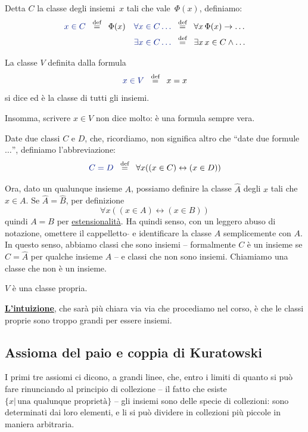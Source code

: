 \begin{notation}
Detta $C$ la classe degli insiemi~$x$ tali che vale~$\Phi(x)$, definiamo:
\begin{align*}
{\drkblu x \in C} &\;\;\Mydef\;\; \Phi(x) & {\drkblu \forall{x\in
C}\dotsc} &\;\;\Mydef\;\; \forall x \,
\Phi(x)\rightarrow\dotsc\\
&& {\drkblu \exists{x\in C}\dotsc} &\;\;\Mydef\;\; \exists x \,
x\in C \land \dotsc
\end{align*}
\end{notation}

\begin{definition}
La classe $V$ definita dalla formula
\[ {\drkblu x \in V} \;\;\Mydef\;\; x = x \]
si dice  ed \`e la classe di tutti gli insiemi.
\end{definition}

\begin{note}
Insomma, scrivere $x \in V$ non dice molto: \`e una formula sempre vera.
\end{note}

\begin{notation}
Date due classi $C$ e $D$, che, ricordiamo, non significa altro che ``date due formule$\ldots$'', definiamo l'abbreviazione:
\[ {\drkblu C = D} \;\;\Mydef\;\; \forall x ((x \in C) \leftrightarrow (x \in D))
\]
\end{notation}

Ora, dato un qualunque insieme $A$, possiamo definire la classe $\hat{A}$
degli $x$ tali che $x \in A$. Se $\hat{A} = \hat{B}$, per definizione
\[ \forall x ((x \in A) \leftrightarrow (x \in B))
	\]
quindi $A = B$ per \hyperref[ax2]{estensionalit\`a}. Ha quindi senso, con un leggero abuso di notazione, omettere il cappelletto $\hat{}$ e identificare la classe $\hat{A}$ semplicemente con $A$. In questo senso,
abbiamo classi che sono insiemi -- formalmente $C$ \`e un insieme se $C =
\hat{A}$ per qualche insieme $A$ -- e classi che non sono insiemi.
Chiamiamo  una classe che non \`e un insieme.

\begin{example}
$V$ \`e una classe propria.
\end{example}

\textbf{\underline{L'intuizione}}, che sar\`a pi\`u chiara via via che procediamo nel corso, \`e che le classi proprie sono troppo grandi per essere insiemi.

\subsection{Assioma del paio e coppia di Kuratowski}
I primi tre assiomi ci dicono, a grandi linee, che, entro i limiti di
quanto si pu\`o fare rinunciando al principio di collezione -- il fatto
che esiste $\{x | \, \text{una qualunque propriet\`a}\}$ -- gli insiemi
sono delle specie di collezioni:
sono determinati dai loro elementi, e li si pu\`o dividere in collezioni pi\`u piccole in maniera arbitraria.

